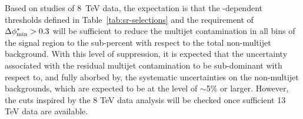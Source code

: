 Based on studies of 8~TeV data, the expectation is that the
\HT-dependent \alphat thresholds defined in
Table~\ref{tab:sr-selections} and the requirement of $\bdphi > 0.3$
will be sufficient to reduce the multijet contamination in all bins of
the signal region to the sub-percent with respect to the total
non-multijet background. With this level of suppression, it is
expected that the uncertainty associated with the residual multijet
contamination to be sub-dominant with respect to, and fully aborbed
by, the systematic uncertainties on the non-multijet backgrounds,
which are expected to be at the level of $\sim$5\% or larger. 
However, the cuts inspired by the 8 TeV data analysis will be checked
once sufficient 13 TeV data are available.
